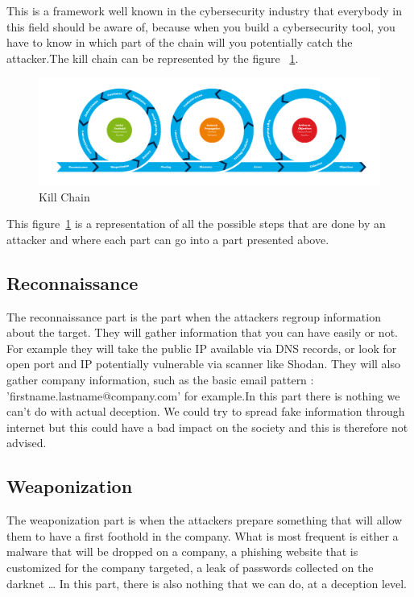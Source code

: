 \documentclass{tnreport}
\begin{document}
This is a framework well known in the cybersecurity industry that everybody in this field should be aware of, because when you build a cybersecurity tool, you have to know in which part of the chain will you potentially catch the attacker.\eol The kill chain can be represented by the figure ~\ref{killchain}.

\begin{figure}[h!]
  \begin{center}
  \includegraphics[scale=0.5]{figures/Kill_Chain}
  \caption{Kill Chain \cite{lib18}}
  \label{killchain}
  \end{center}
\end{figure}

This figure~\ref{killchain} is a representation of all the possible steps that are done by an attacker and where each part can go into a part presented above.

\subsection{Reconnaissance}
The reconnaissance part is the part when the attackers regroup information about the target. They will gather information that you can have easily or not. For example they will take the public IP available via DNS records, or look for open port and IP potentially vulnerable via scanner like Shodan\cite{lib26}. They will also gather company information, such as the basic email pattern : 'firstname.lastname@company.com' for example.\eol In this part there is nothing we can't do with actual deception. We could try to spread fake information through internet but this could have a bad impact on the society and this is therefore not advised. 

\subsection{Weaponization}
The weaponization part is when the attackers prepare something that will allow them to have a first foothold in the company. What is most frequent is either a malware that will be dropped on a company, a phishing website that is customized for the company targeted, a leak of passwords collected on the darknet \ldots
In this part, there is also nothing that we can do, at a deception level.
\end{document}
